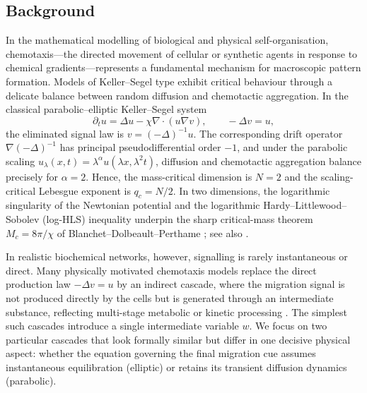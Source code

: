 \documentclass[11pt,reqno]{amsart}
\theoremstyle{definition}
\theoremstyle{remark}
\newcommand{\Div}{\nabla\!\cdot}
\begin{document}
\subsection{Background}
\label{subsec:background}
In the mathematical modelling of biological and physical self-organisation, chemotaxis---the directed movement of cellular or synthetic agents in response to chemical gradients---represents a fundamental mechanism for macroscopic pattern formation. Models of Keller--Segel type \cite{keller1970initiation,keller1971model} exhibit critical behaviour through a delicate balance between random diffusion and chemotactic aggregation. In the classical parabolic--elliptic Keller--Segel system
\begin{equation}\label{eq:KS-classical}
        \partial_t u=\Delta u-\chi\Div(u\nabla v),
        \qquad
        -\Delta v=u,
\end{equation}
the eliminated signal law is $v=(-\Delta)^{-1}u$. The corresponding drift operator $\nabla(-\Delta)^{-1}$ has principal pseudodifferential order $-1$, and under the parabolic scaling
$u_\lambda(x,t)=\lambda^{\alpha}u(\lambda x,\lambda^{2}t)$, diffusion and chemotactic aggregation balance precisely for $\alpha=2$. Hence, the mass-critical dimension is $N=2$ and the scaling-critical Lebesgue exponent is $q_c=N/2$. In two dimensions, the logarithmic singularity of the Newtonian potential and the logarithmic Hardy--Littlewood--Sobolev (log-HLS) inequality \cite{beckner1993sharp,carlen1992competing} underpin the sharp critical-mass theorem $M_c=8\pi/\chi$ of Blanchet--Dolbeault--Perthame \cite{blanchet2006two}; see also \cite{jager1992explosions, nagai1995blow, gajewski1998global,liu2025bidirectional,horstmann20031970}.

In realistic biochemical networks, however, signalling is rarely instantaneous or direct. Many physically motivated chemotaxis models replace the direct production law $-\Delta v=u$ by an indirect cascade, where the migration signal is not produced directly by the cells but is generated through an intermediate substance, reflecting multi-stage metabolic or kinetic processing \cite{fujie2017application,tao2017critical,wang2026algebraic}. The simplest such cascades introduce a single intermediate variable $w$. We focus on two particular cascades that look formally similar but differ in one decisive physical aspect: whether the equation governing the final migration cue assumes instantaneous equilibration (elliptic) or retains its transient diffusion dynamics (parabolic).
\end{document}
